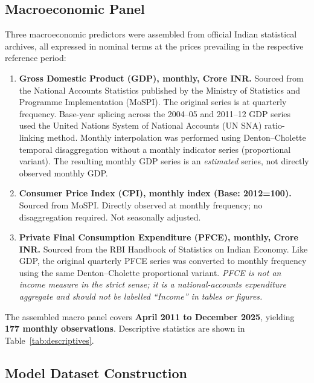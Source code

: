 \documentclass[11pt,a4paper]{article}
\begin{document}
\subsection{Macroeconomic Panel}
\label{subsec:macro}

Three macroeconomic predictors were assembled from official Indian statistical
archives, all expressed in nominal terms at the prices prevailing in the
respective reference period:

\begin{enumerate}
  \item \textbf{Gross Domestic Product (GDP), monthly, Crore INR.}
        Sourced from the National Accounts Statistics published by the Ministry
        of Statistics and Programme Implementation (MoSPI).  The original series
        is at quarterly frequency.  Base-year splicing across the 2004--05 and
        2011--12 GDP series used the United Nations System of National Accounts
        (UN SNA) ratio-linking method.  Monthly interpolation was performed using
        Denton--Cholette temporal disaggregation without a monthly indicator
        series (proportional variant).  The resulting monthly GDP series is an
        \emph{estimated} series, not directly observed monthly GDP.

  \item \textbf{Consumer Price Index (CPI), monthly index (Base: 2012=100).}
        Sourced from MoSPI.  Directly observed at monthly frequency; no
        disaggregation required.  Not seasonally adjusted.

  \item \textbf{Private Final Consumption Expenditure (PFCE), monthly, Crore
        INR.}  Sourced from the RBI Handbook of Statistics on Indian Economy.
        Like GDP, the original quarterly PFCE series was converted to monthly
        frequency using the same Denton--Cholette proportional variant.
        \emph{PFCE is not an income measure in the strict sense; it is a
        national-accounts expenditure aggregate and should not be labelled
        ``Income'' in tables or figures.}
\end{enumerate}

\noindent The assembled macro panel covers \textbf{April 2011 to December 2025},
yielding \textbf{177 monthly observations}.  Descriptive statistics are shown
in Table~\ref{tab:descriptives}.



\subsection{Model Dataset Construction}
\label{subsec:merge}
\end{document}
